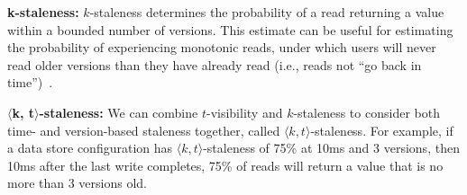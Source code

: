 \textbf{k-staleness:} $k$-staleness determines the probability of a
read returning a value within a bounded number of versions. This
estimate can be useful for estimating the probability of experiencing
monotonic reads, under which users will never read older versions than
they have already read (i.e., reads not ``go back in
time'')~\cite{vogels-defs}.

\textbf{$\langle$k, t$\rangle$-staleness:} We can combine $t$-visibility
and $k$-staleness to consider both time- and version-based staleness
together, called $\langle k, t \rangle$-staleness. For example, if a
data store configuration has $\langle k, t \rangle$-staleness of 75\%
at 10ms and 3 versions, then 10ms after the last write completes, 75\%
of reads will return a value that is no more than 3 versions old.




